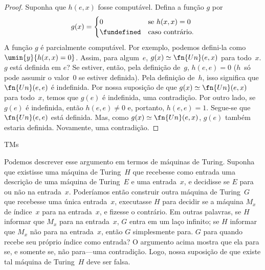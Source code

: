 \documentclass[../../../include/open-logic-section]{subfiles}
\begin{document}
\begin{proof}
Suponha que $h(e,x)$ fosse computável. Defina a função $g$ por
\[
g(x) =
\begin{cases}
  0                & \text{se $h(x,x) = 0$} \\
  \fundefined & \text{caso contrário.}
\end{cases}
\]
A função $g$ é parcialmente computável. Por exemplo, podemos defini-la
como $\umin{y}{h(x,x) = 0}$. Assim, para algum~$e$,
$g(x) \simeq \fn{Un}(e, x)$ para todo~$x$. $g$ está definida em $e$?
Se estiver, então, pela definição de~$g$, $h(e,e) = 0$ ($h$~só pode
assumir o valor~$0$ se estiver definida). Pela definição de~$h$, isso
significa que $\fn{Un}(e, e)$ é indefinida. Por nossa suposição de que
$g(x) \simeq \fn{Un}(e, x)$ para todo~$x$, temos que $g(e)$ é
indefinida, uma contradição. Por outro lado, se $g(e)$ é indefinida,
então $h(e,e) \neq 0$ e, portanto, $h(e,e) = 1$. Segue-se que
$\fn{Un}(e, e)$ está definida. Mas, como
$g(x) \simeq \fn{Un}(e, x)$, $g(e)$ também estaria definida. Novamente,
uma contradição.
\end{proof}

\begin{tagblock}{TMs}
\begin{explain}
Podemos descrever esse argumento em termos de máquinas de Turing.
Suponha que existisse uma máquina de Turing~$H$ que recebesse como
entrada uma descrição de uma máquina de Turing~$E$ e uma entrada~$x$,
e decidisse se $E$ para ou não na entrada~$x$. Poderíamos então
construir outra máquina de Turing~$G$ que recebesse uma única entrada~$x$,
executasse $H$ para decidir se a máquina $M_x$ de índice~$x$ para na
entrada~$x$, e fizesse o contrário. Em outras palavras, se $H$
informar que $M_x$ para na entrada~$x$, $G$ entra em um laço infinito;
se $H$ informar que $M_x$ não para na entrada~$x$, então $G$
simplesmente para. $G$ para quando recebe seu próprio índice como
entrada? O argumento acima mostra que ela para se, e somente se, não
para---uma contradição. Logo, nossa suposição de que existe tal máquina
de Turing~$H$ deve ser falsa.
\end{explain}
\end{tagblock}
\end{document}
